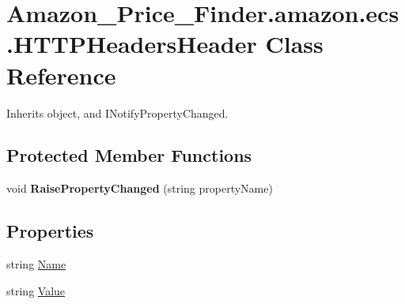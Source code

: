\hypertarget{class_amazon___price___finder_1_1amazon_1_1ecs_1_1_h_t_t_p_headers_header}{\section{Amazon\-\_\-\-Price\-\_\-\-Finder.\-amazon.\-ecs.\-H\-T\-T\-P\-Headers\-Header Class Reference}
\label{class_amazon___price___finder_1_1amazon_1_1ecs_1_1_h_t_t_p_headers_header}
}


 




Inherits object, and I\-Notify\-Property\-Changed.

\subsection*{Protected Member Functions}
\begin{DoxyCompactItemize}
\item 
\hypertarget{class_amazon___price___finder_1_1amazon_1_1ecs_1_1_h_t_t_p_headers_header_af4209eef1a65af33f21f9a8317d2ebf1}{void {\bfseries Raise\-Property\-Changed} (string property\-Name)}\label{class_amazon___price___finder_1_1amazon_1_1ecs_1_1_h_t_t_p_headers_header_af4209eef1a65af33f21f9a8317d2ebf1}

\end{DoxyCompactItemize}
\subsection*{Properties}
\begin{DoxyCompactItemize}
\item 
\hypertarget{class_amazon___price___finder_1_1amazon_1_1ecs_1_1_h_t_t_p_headers_header_a46488eb313465ed78c75b435016afdb8}{string \hyperlink{class_amazon___price___finder_1_1amazon_1_1ecs_1_1_h_t_t_p_headers_header_a46488eb313465ed78c75b435016afdb8}{Name}}\label{class_amazon___price___finder_1_1amazon_1_1ecs_1_1_h_t_t_p_headers_header_a46488eb313465ed78c75b435016afdb8}

\begin{DoxyCompactList}\small\item\em \end{DoxyCompactList}\item 
\hypertarget{class_amazon___price___finder_1_1amazon_1_1ecs_1_1_h_t_t_p_headers_header_a47d0c2a86de14860a475e0d90f004911}{string \hyperlink{class_amazon___price___finder_1_1amazon_1_1ecs_1_1_h_t_t_p_headers_header_a47d0c2a86de14860a475e0d90f004911}{Value}}\label{class_amazon___price___finder_1_1amazon_1_1ecs_1_1_h_t_t_p_headers_header_a47d0c2a86de14860a475e0d90f004911}

\begin{DoxyCompactList}\small\item\em \end{DoxyCompactList}\end{DoxyCompactItemize}
